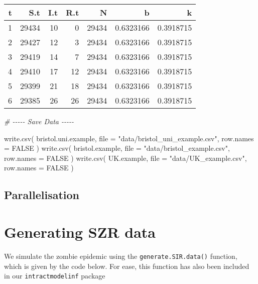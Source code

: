 \documentclass[
]{article}
\newenvironment{Shaded}{\begin{snugshade}}{\end{snugshade}}
\newcommand{\AttributeTok}[1]{\textcolor[rgb]{0.77,0.63,0.00}{#1}}
\newcommand{\CommentTok}[1]{\textcolor[rgb]{0.56,0.35,0.01}{\textit{#1}}}
\newcommand{\ConstantTok}[1]{\textcolor[rgb]{0.00,0.00,0.00}{#1}}
\newcommand{\FunctionTok}[1]{\textcolor[rgb]{0.00,0.00,0.00}{#1}}
\newcommand{\NormalTok}[1]{#1}
\newcommand{\StringTok}[1]{\textcolor[rgb]{0.31,0.60,0.02}{#1}}
\begin{document}
\begin{longtable}[]{@{}rrrrrrr@{}}
\toprule()
t & S.t & I.t & R.t & N & b & k \\
\midrule()
\endhead
1 & 29434 & 10 & 0 & 29434 & 0.6323166 & 0.3918715 \\
2 & 29427 & 12 & 3 & 29434 & 0.6323166 & 0.3918715 \\
3 & 29419 & 14 & 7 & 29434 & 0.6323166 & 0.3918715 \\
4 & 29410 & 17 & 12 & 29434 & 0.6323166 & 0.3918715 \\
5 & 29399 & 21 & 18 & 29434 & 0.6323166 & 0.3918715 \\
6 & 29385 & 26 & 26 & 29434 & 0.6323166 & 0.3918715 \\
\bottomrule()
\end{longtable}

\begin{Shaded}
\begin{Highlighting}[]
\CommentTok{\# {-}{-}{-}{-}{-} Save Data {-}{-}{-}{-}{-}}

\FunctionTok{write.csv}\NormalTok{( bristol.uni.example, }\AttributeTok{file =} \StringTok{"data/bristol\_uni\_example.csv"}\NormalTok{, }\AttributeTok{row.names =} \ConstantTok{FALSE}\NormalTok{ )}
\FunctionTok{write.csv}\NormalTok{( bristol.example,     }\AttributeTok{file =} \StringTok{"data/bristol\_example.csv"}\NormalTok{, }\AttributeTok{row.names =} \ConstantTok{FALSE}\NormalTok{ )}
\FunctionTok{write.csv}\NormalTok{( UK.example,          }\AttributeTok{file =} \StringTok{"data/UK\_example.csv"}\NormalTok{, }\AttributeTok{row.names =} \ConstantTok{FALSE}\NormalTok{ )}
\end{Highlighting}
\end{Shaded}

\hypertarget{parallelisation}{%
\subsection{Parallelisation}\label{parallelisation}}

\hypertarget{generating-szr-data}{%
\section{Generating SZR data}\label{generating-szr-data}}

We simulate the zombie epidemic using the \texttt{generate.SIR.data()}
function, which is given by the code below. For ease, this function has
also been included in our \texttt{intractmodelinf} package
\end{document}
